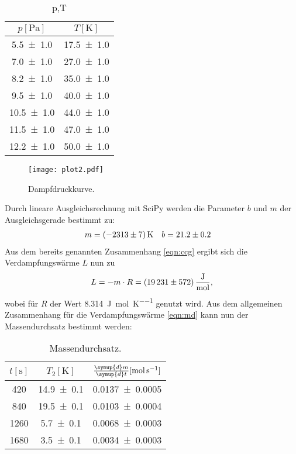 \begin{table}
  \centering
  \caption{p,T}
  \label{tab:tabelle3}
\begin{tabular}{c c}
  \toprule
  {$p [\si{\pascal}]$} & {$T [\si{\kelvin}]$}\\
  \midrule
  \num{5.5 +- 1.0}  & \num{17.5 +- 1.0} \\
  \num{7.0 +- 1.0}  & \num{27.0 +- 1.0} \\
  \num{8.2 +- 1.0}  & \num{35.0 +- 1.0} \\
  \num{9.5 +- 1.0}  & \num{40.0 +- 1.0} \\
  \num{10.5 +- 1.0} & \num{44.0 +- 1.0} \\
  \num{11.5 +- 1.0} & \num{47.0 +- 1.0} \\
  \num{12.2 +- 1.0} & \num{50.0 +- 1.0} \\
  \bottomrule
\end{tabular}
\end{table}

\begin{figure}[H]
  \centering
  \texttt{[image: plot2.pdf]}
  \caption{Dampfdruckkurve.}
  \label{fig:plot2}
\end{figure}
Durch lineare Ausgleichsrechnung mit SciPy werden die Parameter $b$ und $m$ der Ausgleichsgerade bestimmt zu:
\begin{align*}
m &= \SI{-2313 +- 7}{\kelvin} & b &= \num{21.2 +- 0.2}
\end{align*}
Aus dem bereits genannten Zusammenhang \eqref{eqn:ccg} ergibt sich die Verdampfungswärme $L$ nun zu
\begin{align*}
  L = -m \cdot R = \SI[per-mode=fraction]{19231 +- 572}{\joule\per\mol},
\end{align*}
wobei für $R$ der Wert \SI{8.314}{\joule\per\mol\per\kelvin} genutzt wird. \cite{codata}
Aus dem allgemeinen Zusammenhang für die Verdampfungswärme \eqref{eqn:md} kann nun der Massendurchsatz bestimmt werden:

\begin{table}
  \centering
  \caption{Massendurchsatz.}
  \label{tab:tabelle4}
\begin{tabular}{c c c}
  \toprule
  {$t [\si{\second}]$} & {$T_2 [\si{\kelvin}]$} & {$\frac{\symup{d} m}{\symup{d} t} [\si{\mol\per\second}]$}\\
  \midrule
  \num{420} & \num{14.9 +- 0.1} & \num{0.0137 +- 0.0005} \\
  \num{840} & \num{19.5 +- 0.1} & \num{0.0103 +- 0.0004}\\
  \num{1260} & \num{5.7 +- 0.1} & \num{0.0068 +- 0.0003}  \\
  \num{1680} & \num{3.5 +- 0.1} & \num{0.0034 +- 0.0003} \\
  \bottomrule
\end{tabular}
\end{table}
